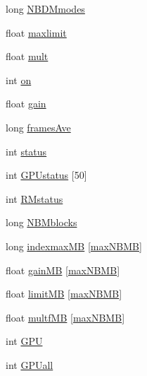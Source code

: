 \begin{DoxyCompactItemize}
\item 
long \hyperlink{structAOLOOPCONTROL__CONF_aee35ddb98b18714ed8d71cb7c843d652}{N\+B\+D\+Mmodes}
\item 
float \hyperlink{structAOLOOPCONTROL__CONF_a471189277591da1769fcb1c11696949b}{maxlimit}
\item 
float \hyperlink{structAOLOOPCONTROL__CONF_afa3e61913c4a9174ab6b44bef3b55777}{mult}
\item 
int \hyperlink{structAOLOOPCONTROL__CONF_a2b8d11e19cdaa3aff64d6eb612677380}{on}
\item 
float \hyperlink{structAOLOOPCONTROL__CONF_acf3d0a55c37a60451e4eff487c94bdf7}{gain}
\item 
long \hyperlink{structAOLOOPCONTROL__CONF_a58b166cf224e4fd10f35e15beda99b65}{frames\+Ave}
\item 
int \hyperlink{structAOLOOPCONTROL__CONF_a3612d14151fcd3a781096b07d64da501}{status}
\item 
int \hyperlink{structAOLOOPCONTROL__CONF_ab64cbc52f1e701b35c7a64eaa36be3dc}{G\+P\+Ustatus} \mbox{[}50\mbox{]}
\item 
int \hyperlink{structAOLOOPCONTROL__CONF_a8041e3145f9835b6cc5eab30475b3b79}{R\+Mstatus}
\item 
long \hyperlink{structAOLOOPCONTROL__CONF_ad9f537107febb80a6194ec76eaa223a0}{N\+B\+Mblocks}
\item 
long \hyperlink{structAOLOOPCONTROL__CONF_a71af8228ceacd218f14c15ba3f11aa30}{indexmax\+M\+B} \mbox{[}\hyperlink{AOloopControl_8h_a1607e57c6edf0fe69d995ec9b00b2d2d}{max\+N\+B\+M\+B}\mbox{]}
\item 
float \hyperlink{structAOLOOPCONTROL__CONF_a73c5bf44e2626148a50ccd1cef07ff4b}{gain\+M\+B} \mbox{[}\hyperlink{AOloopControl_8h_a1607e57c6edf0fe69d995ec9b00b2d2d}{max\+N\+B\+M\+B}\mbox{]}
\item 
float \hyperlink{structAOLOOPCONTROL__CONF_a9a4aa38aad10a13adacee397645c7390}{limit\+M\+B} \mbox{[}\hyperlink{AOloopControl_8h_a1607e57c6edf0fe69d995ec9b00b2d2d}{max\+N\+B\+M\+B}\mbox{]}
\item 
float \hyperlink{structAOLOOPCONTROL__CONF_abb37b189dcafce076953d5a18b15dd5c}{multf\+M\+B} \mbox{[}\hyperlink{AOloopControl_8h_a1607e57c6edf0fe69d995ec9b00b2d2d}{max\+N\+B\+M\+B}\mbox{]}
\item 
int \hyperlink{structAOLOOPCONTROL__CONF_a446f7f1a63019aedeebfc864dd969c93}{G\+P\+U}
\item 
int \hyperlink{structAOLOOPCONTROL__CONF_afb9cea47b66e7d00776f2d759ca36e8e}{G\+P\+Uall}
\item 

\end{DoxyCompactItemize}

